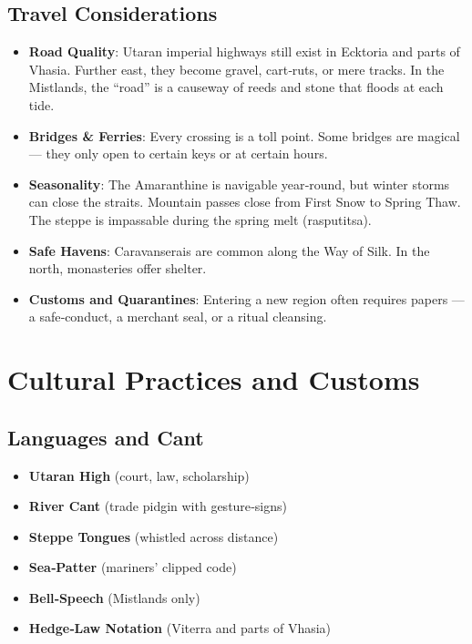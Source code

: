 \subsection*{Travel Considerations}
\begin{itemize}
\item \textbf{Road Quality}: Utaran imperial highways still exist in Ecktoria and parts of Vhasia. Further east, they become gravel, cart‑ruts, or mere tracks. In the Mistlands, the “road” is a causeway of reeds and stone that floods at each tide.
\item \textbf{Bridges \& Ferries}: Every crossing is a toll point. Some bridges are magical — they only open to certain keys or at certain hours.
\item \textbf{Seasonality}: The Amaranthine is navigable year‑round, but winter storms can close the straits. Mountain passes close from First Snow to Spring Thaw. The steppe is impassable during the spring melt (rasputitsa).
\item \textbf{Safe Havens}: Caravanserais are common along the Way of Silk. In the north, monasteries offer shelter.
\item \textbf{Customs and Quarantines}: Entering a new region often requires papers — a safe‑conduct, a merchant seal, or a ritual cleansing.
\end{itemize}

\section{Cultural Practices and Customs}
\label{sec:cultural-practices}

\subsection*{Languages and Cant}
\begin{itemize}
\item \textbf{Utaran High} (court, law, scholarship)
\item \textbf{River Cant} (trade pidgin with gesture‑signs)
\item \textbf{Steppe Tongues} (whistled across distance)
\item \textbf{Sea‑Patter} (mariners’ clipped code)
\item \textbf{Bell‑Speech} (Mistlands only)
\item \textbf{Hedge‑Law Notation} (Viterra and parts of Vhasia)
\end{itemize}

